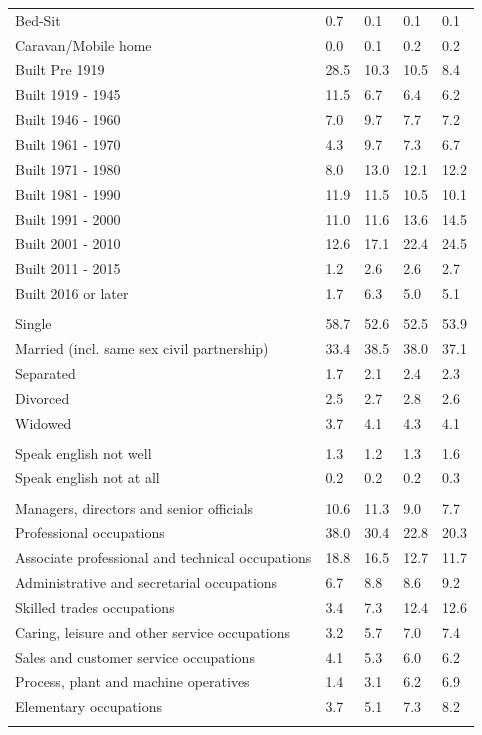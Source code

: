 \documentclass{article}
\begin{document}
\begin{table}[h]
\begin{tabular}{KTTTT}
Bed-Sit & 0.7& 0.1& 0.1& 0.1\\
Caravan/Mobile home & 0.0& 0.1& 0.2& 0.2\\
    \hline
Built Pre 1919 & 28.5& 10.3& 10.5&  8.4\\
Built 1919 - 1945 & 11.5&  6.7&  6.4&  6.2\\
Built  1946 - 1960 & 7.0& 9.7& 7.7& 7.2\\
Built  1961 - 1970 & 4.3& 9.7& 7.3& 6.7\\
Built  1971 - 1980 &  8.0& 13.0& 12.1& 12.2\\
Built  1981 - 1990 & 11.9& 11.5& 10.5& 10.1\\
Built  1991 - 2000 & 11.0& 11.6& 13.6& 14.5\\
Built  2001 - 2010 & 12.6& 17.1& 22.4& 24.5\\
Built  2011 - 2015 & 1.2& 2.6& 2.6& 2.7\\
Built  2016 or later & 1.7& 6.3& 5.0& 5.1\\
\hline
    \\
    \hline
Single & 58.7& 52.6& 52.5& 53.9\\
Married (incl. same sex civil partnership) & 33.4& 38.5& 38.0& 37.1\\
Separated  & 1.7& 2.1& 2.4& 2.3\\
Divorced  & 2.5& 2.7& 2.8& 2.6\\
Widowed & 3.7& 4.1& 4.3& 4.1\\
\hline
    \\ 
    \hline
Speak english not well & 1.3& 1.2& 1.3& 1.6\\
Speak english not at all & 0.2& 0.2& 0.2& 0.3\\
\hline
    \\
    \hline
Managers, directors and senior officials & 10.6& 11.3&  9.0&  7.7\\
Professional occupations & 38.0& 30.4& 22.8& 20.3\\
Associate professional and technical occupations & 18.8& 16.5& 12.7& 11.7\\
Administrative and secretarial occupations & 6.7& 8.8& 8.6& 9.2\\
Skilled trades occupations &  3.4&  7.3& 12.4& 12.6\\
Caring, leisure and other service occupations & 3.2& 5.7& 7.0& 7.4\\
Sales and customer service occupations & 4.1& 5.3& 6.0& 6.2\\
Process, plant and machine operatives & 1.4& 3.1& 6.2& 6.9\\
Elementary occupations & 3.7& 5.1& 7.3& 8.2\\
\hline
\end{tabular}
\end{table}
\end{document}

